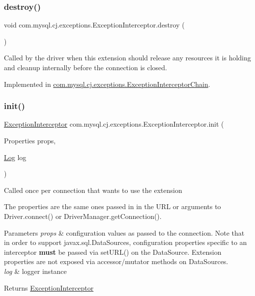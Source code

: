 \subsubsection{\texorpdfstring{destroy()}{destroy()}}
{\footnotesize\ttfamily void com.\+mysql.\+cj.\+exceptions.\+Exception\+Interceptor.\+destroy (\begin{DoxyParamCaption}{ }\end{DoxyParamCaption})}

Called by the driver when this extension should release any resources it is holding and cleanup internally before the connection is closed. 

Implemented in \mbox{\hyperlink{classcom_1_1mysql_1_1cj_1_1exceptions_1_1_exception_interceptor_chain_a23c40128c6933d51a1c29055494180db}{com.\+mysql.\+cj.\+exceptions.\+Exception\+Interceptor\+Chain}}.

\mbox{\label{interfacecom_1_1mysql_1_1cj_1_1exceptions_1_1_exception_interceptor_a5488d80601434446f3f5f73c27226417}} 
\subsubsection{\texorpdfstring{init()}{init()}}
{\footnotesize\ttfamily \mbox{\hyperlink{interfacecom_1_1mysql_1_1cj_1_1exceptions_1_1_exception_interceptor}{Exception\+Interceptor}} com.\+mysql.\+cj.\+exceptions.\+Exception\+Interceptor.\+init (\begin{DoxyParamCaption}\item[{Properties}]{props,  }\item[{\mbox{\hyperlink{interfacecom_1_1mysql_1_1cj_1_1log_1_1_log}{Log}}}]{log }\end{DoxyParamCaption})}

Called once per connection that wants to use the extension

The properties are the same ones passed in in the U\+RL or arguments to Driver.\+connect() or Driver\+Manager.\+get\+Connection().


\begin{DoxyParams}{Parameters}
{\em props} & configuration values as passed to the connection. Note that in order to support javax.\+sql.\+Data\+Sources, configuration properties specific to an interceptor {\bfseries must} be passed via set\+U\+R\+L() on the Data\+Source. Extension properties are not exposed via accessor/mutator methods on Data\+Sources. \\
\hline
{\em log} & logger instance \\
\hline
\end{DoxyParams}
\begin{DoxyReturn}{Returns}
\mbox{\hyperlink{interfacecom_1_1mysql_1_1cj_1_1exceptions_1_1_exception_interceptor}{Exception\+Interceptor}} 
\end{DoxyReturn}


